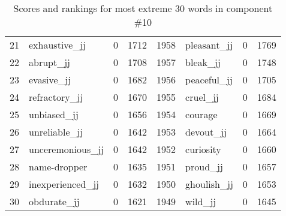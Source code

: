 \begin{table}[tbp]
\begin{tabular}{| rlr@{.}l | rlr@{.}l |}
    21 & exhaustive\_jj & 0 & 1712    &    1958 & pleasant\_jj & 0 & 1769 \\
    22 & abrupt\_jj & 0 & 1708    &    1957 & bleak\_jj & 0 & 1748 \\
    23 & evasive\_jj & 0 & 1682    &    1956 & peaceful\_jj & 0 & 1705 \\
    24 & refractory\_jj & 0 & 1670    &    1955 & cruel\_jj & 0 & 1684 \\
    25 & unbiased\_jj & 0 & 1656    &    1954 & courage & 0 & 1669 \\
    26 & unreliable\_jj & 0 & 1642    &    1953 & devout\_jj & 0 & 1664 \\
    27 & unceremonious\_jj & 0 & 1642    &    1952 & curiosity & 0 & 1660 \\
    28 & name-dropper & 0 & 1635    &    1951 & proud\_jj & 0 & 1657 \\
    29 & inexperienced\_jj & 0 & 1632    &    1950 & ghoulish\_jj & 0 & 1653 \\
    30 & obdurate\_jj & 0 & 1621    &    1949 & wild\_jj & 0 & 1645 \\
    \hline
    \end{tabular}
    \caption{Scores and rankings for most extreme 30 words in component \#10} 
\end{table}
\clearpage
